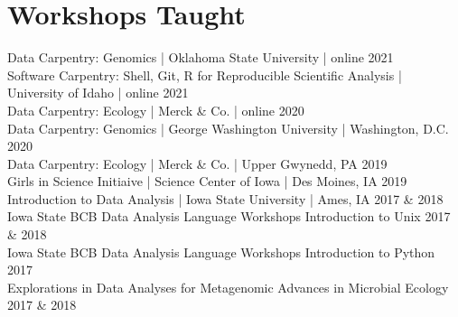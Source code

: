 
\section*{Workshops Taught}

    Data Carpentry: Genomics | Oklahoma State University | online \hfill 2021 \\[0cm]
    Software Carpentry: Shell, Git, R for Reproducible Scientific Analysis | University of Idaho | online \hfill 2021 \\[0cm]
    Data Carpentry: Ecology | Merck \& Co. | online \hfill 2020 \\[0cm]
    Data Carpentry: Genomics | George Washington University | Washington, D.C. \hfill 2020 \\[0cm]
    Data Carpentry: Ecology | Merck \& Co. | Upper Gwynedd, PA \hfill 2019 \\[0cm]
    Girls in Science Initiaive | Science Center of Iowa | Des Moines, IA \hfill 2019 \\[0cm]
    Introduction to Data Analysis | Iowa State University | Ames, IA \hfill 2017 \& 2018 \\[0cm]
    Iowa State BCB Data Analysis Language Workshops Introduction to Unix \hfill 2017 \& 2018 \\[0cm]
    Iowa State BCB Data Analysis Language Workshops Introduction to Python \hfill 2017 \\[0cm]
    Explorations in Data Analyses for Metagenomic Advances in Microbial Ecology \hfill 2017 \& 2018 \\[0cm]

